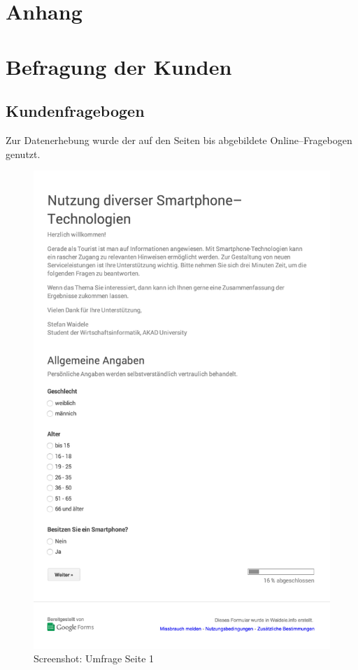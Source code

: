 
\appendix
\section*{Anhang}

\section*{Befragung der Kunden}
\label{sec:kundenbefragung}
\subsection*{Kundenfragebogen}

Zur Datenerhebung wurde der auf den Seiten \pageref{pic:us1} bis \pageref{pic:us1} abgebildete Online–Fragebogen genutzt. 

\begin{figure}[H]
\begin{center}
\includegraphics[width=.6\textwidth]{Umfrage-S1.png}
\caption{Screenshot: Umfrage Seite 1}
\label{pic:us1}
\end{center}
\end{figure}

